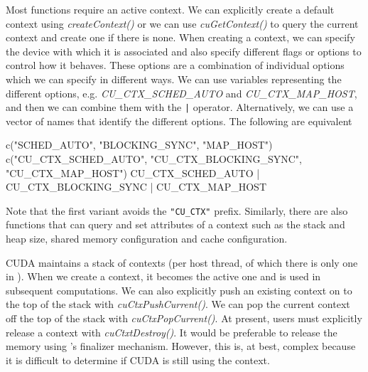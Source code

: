 \documentclass[article]{jss}
\def\R{\proglang{R}}
\def\Rpkg#1{\pkg{#1}}
\def\Rfunc#1{\textsl{#1()}}
\def\Rop#1{\texttt{#1}}
\def\Rvar#1{\textsl{#1}}
\begin{document}
Most \Rpkg{RCUDA} functions require an active context.  We can
explicitly create a default context using \Rfunc{createContext} or we
can use \Rfunc{cuGetContext} to query the current context and create
one if there is none.  When creating a context, we can specify the
device with which it is associated and also specify different flags or
options to control how it behaves.  These options are a combination of
individual options which we can specify in different ways. 
We can use \R{} variables representing the different options, e.g.
\Rvar{CU_CTX\_SCHED\_AUTO} and \Rvar{CU\_CTX\_MAP\_HOST},
and then we can combine them with the \Rop{|} operator. 
Alternatively, we can use a vector of names that identify the
different options. 
The following are equivalent
\begin{RCode}
c("SCHED_AUTO", "BLOCKING_SYNC", "MAP_HOST")
c("CU_CTX_SCHED_AUTO", "CU_CTX_BLOCKING_SYNC", "CU_CTX_MAP_HOST")
CU_CTX_SCHED_AUTO | CU_CTX_BLOCKING_SYNC | CU_CTX_MAP_HOST
\end{RCode}
Note that the first variant avoids the \texttt{"CU_CTX"} prefix.
Similarly, there are also functions that can query and set attributes of a
context such as the stack and heap size, shared memory configuration
and cache configuration.

CUDA maintains a stack of contexts (per host thread, of which there
is only one in \R).  When we create a context, it becomes the active
one and is used in subsequent computations.  We can also explicitly
push an existing context on to the top of the stack with
\Rfunc{cuCtxPushCurrent}.  We can pop the current context off the top
of the stack with \Rfunc{cuCtxPopCurrent}.  At present, \R{} users
must explicitly release a context with \Rfunc{cuCtxtDestroy}.  It
would be preferable to release the memory using \R's finalizer
mechanism. However, this is, at best, complex because it is difficult
to determine if CUDA is still using the context.
\end{document}
